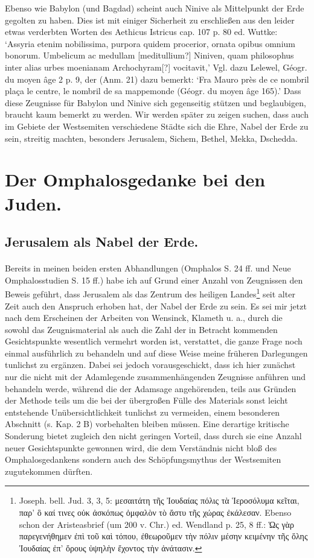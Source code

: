 \documentclass[a4paper, 11pt, oneside]{article}
\begin{document}
Ebenso wie Babylon (und Bagdad) scheint auch Ninive als Mittelpunkt der Erde gegolten zu haben. Dies ist mit einiger Sicherheit zu erschließen aus den leider etwas verderbten Worten des Aethicus Istricus cap. 107 p. 80 ed. Wuttke: `Assyria etenim nobilissima, purpora quidem procerior, ornata opibus omnium bonorum. Umbelicum ac medullam [meditullium?] Niniven, quam philosophus inter alias urbes moenianam Archochyram[?] vocitavit,' Vgl. dazu Lelewel, Géogr. du moyen âge 2 p. 9, der (Anm. 21) dazu bemerkt: `Fra Mauro près de ce nombril plaça le centre, le nombril de sa mappemonde (Géogr. du moyen âge 165).' Dass diese Zeugnisse für Babylon und Ninive sich gegenseitig stützen und beglaubigen, braucht kaum bemerkt zu werden. Wir werden später zu zeigen suchen, dass auch im Gebiete der Westsemiten verschiedene Städte sich die Ehre, Nabel der Erde zu sein, streitig machten, besonders Jerusalem, Sichem, Bethel, Mekka, Dschedda.
\clearpage
\section{Der Omphalosgedanke bei den Juden.}
\subsection{Jerusalem als Nabel der Erde.}
\paragraph{}
Bereits in meinen beiden ersten Abhandlungen (Omphalos S. 24 ff. und Neue Omphalosstudien S. 15 ff.) habe ich auf Grund einer Anzahl von Zeugnissen den Beweis geführt, dass Jerusalem als das Zentrum des heiligen Landes\footnote{Joseph. bell. Jud. 3, 3, 5: μεσαιτάτη τῆς Ἰουδαίας πόλις τὰ Ἱεροσόλυμα κεῖται, παρ' ὃ καί τινες οὐκ ἀσκόπως ὀμφαλὸν τὸ ἄστυ τῆς χώρας ἐκάλεσαν. Ebenso schon der Aristeasbrief (um 200 v. Chr.) ed. Wendland p. 25, 8 ff.: Ὡς γὰρ παρεγενήθημεν ἐπὶ τοῦ καὶ τόπου, ἐθεωροῦμεν τὴν πόλιν μέσην κειμένην τῆς ὅλης Ἰουδαίας ἐπ' ὄρους ὑψηλὴν ἔχοντος τὴν ἀνάτασιν.} seit alter Zeit auch den Anspruch erhoben hat, der Nabel der Erde zu sein. Es sei mir jetzt nach dem Erscheinen der Arbeiten von Wensinck, Klameth u. a., durch die sowohl das Zeugnismaterial als auch die Zahl der in Betracht kommenden Gesichtspunkte wesentlich vermehrt worden ist, verstattet, die ganze Frage noch einmal ausführlich zu behandeln und auf diese Weise meine früheren Darlegungen tunlichst zu ergänzen. Dabei sei jedoch vorausgeschickt, dass ich hier zunächst nur die nicht mit der Adamlegende zusammenhängenden Zeugnisse anführen und behandeln werde, während die der Adamsage angehörenden, teils aus Gründen der Methode teils um die bei der übergroßen Fülle des Materials sonst leicht entstehende Unübersichtlichkeit tunlichst zu vermeiden, einem besonderen Abschnitt (s. Kap. 2 B) vorbehalten bleiben müssen. Eine derartige kritische Sonderung bietet zugleich den nicht geringen Vorteil, dass durch sie eine Anzahl neuer Gesichtspunkte gewonnen wird, die dem Verständnis nicht bloß des Omphalosgedankens sondern auch des Schöpfungsmythus der Westsemiten zugutekommen dürften.
\end{document}
